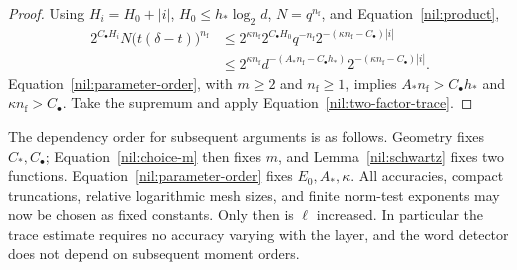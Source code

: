\begin{proof}
Using \(H_i=H_0+|i|\), \(H_0\le h_*\log_2d\),
\(N=q^{n_{\mathrm f}}\), and Equation~\ref{nil:product},
\begin{align*}
 2^{C_\bullet H_i}N\bigl(t(\delta-t)\bigr)^{n_{\mathrm f}}
 &\le 2^{\kappa n_{\mathrm f}}
       2^{C_\bullet H_0}q^{-n_{\mathrm f}}
       2^{-(\kappa n_{\mathrm f}-C_\bullet)|i|}\\
 &\le 2^{\kappa n_{\mathrm f}}
       d^{-(A_*n_{\mathrm f}-C_\bullet h_*)}
       2^{-(\kappa n_{\mathrm f}-C_\bullet)|i|}.
\end{align*}
Equation~\ref{nil:parameter-order}, with \(m\ge2\) and
\(n_{\mathrm f}\ge1\), implies
\(A_*n_{\mathrm f}>C_\bullet h_*\) and
\(\kappa n_{\mathrm f}>C_\bullet\).
Take the supremum and apply Equation~\ref{nil:two-factor-trace}.
\end{proof}

The dependency order for subsequent arguments is as follows.
Geometry fixes \(C_*,C_\bullet\); Equation~\ref{nil:choice-m}
then fixes \(m\), and Lemma~\ref{nil:schwartz} fixes two functions.
Equation~\ref{nil:parameter-order} fixes \(E_0,A_*,\kappa\).
All accuracies, compact truncations, relative logarithmic mesh
sizes, and finite norm-test exponents may now be chosen as
fixed constants. Only then is \(\ell\) increased. In particular
the trace estimate requires no accuracy varying with the layer,
and the word detector does not depend on subsequent moment orders.
